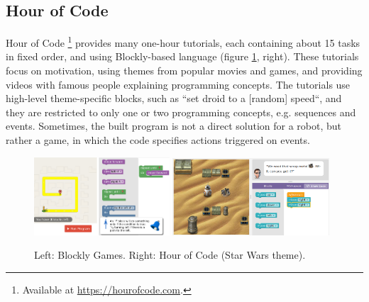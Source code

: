 
\subsection{Hour of Code}
\label{sec:hoc}
Hour of Code%
\footnote{Available at \url{https://hourofcode.com}.}
provides many one-hour tutorials, each containing about 15 tasks in fixed order,
and using Blockly-based language
(figure \ref{fig:blockly-hoc}, right).
These tutorials focus on motivation, using themes from popular movies and
games, and providing videos with famous people explaining programming concepts.
The tutorials use high-level theme-specific blocks, such as ``set droid to a
[random] speed``, and they are restricted to only one or two programming
concepts, e.g. sequences and events.
Sometimes, the built program is not a direct solution for a robot,
but rather a game, in which the code specifies actions triggered on events.


\begin{figure}[htb]
\begin{center}
  \includegraphics[width=0.45\textwidth]{img/blockly-nested}
  \includegraphics[width=0.52\textwidth]{img/hour-of-code-sw}
\end{center}
\caption{%
  Left: Blockly Games.
  Right: Hour of Code (Star Wars theme).}
\label{fig:blockly-hoc}
\end{figure}


